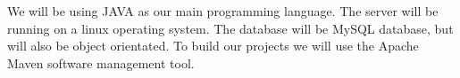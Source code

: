 We will be using JAVA as our main programming language. The server will be running on a linux operating system. The database will be MySQL database, but will also be object orientated. To build our projects we will use the Apache Maven software management tool.
